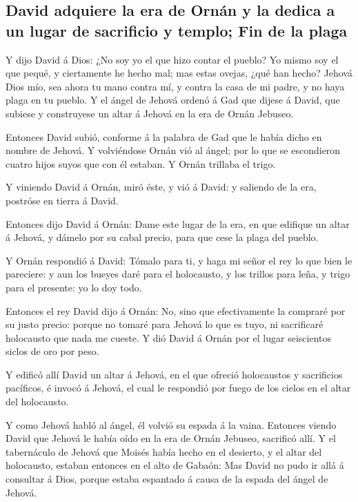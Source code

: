 \hypertarget{david-adquiere-la-era-de-ornuxe1n-y-la-dedica-a-un-lugar-de-sacrificio-y-templo-fin-de-la-plaga}{%
\subsection{David adquiere la era de Ornán y la dedica a un lugar de
sacrificio y templo; Fin de la
plaga}\label{david-adquiere-la-era-de-ornuxe1n-y-la-dedica-a-un-lugar-de-sacrificio-y-templo-fin-de-la-plaga}}

 Y dijo David á Dios: ¿No soy yo el que hizo contar el
pueblo? Yo mismo soy el que pequé, y ciertamente he hecho mal; mas estas
ovejas, ¿qué han hecho? Jehová Dios mío, sea ahora tu mano contra mí, y
contra la casa de mi padre, y no haya plaga en tu pueblo. 
Y el ángel de Jehová ordenó á Gad que dijese á David, que subiese y
construyese un altar á Jehová en la era de Ornán Jebuseo.

 Entonces David subió, conforme á la palabra de Gad que le
había dicho en nombre de Jehová.  Y volviéndose Ornán vió
al ángel; por lo que se escondieron cuatro hijos suyos que con él
estaban. Y Ornán trillaba el trigo.

 Y viniendo David á Ornán, miró éste, y vió á David: y
saliendo de la era, postróse en tierra á David.

 Entonces dijo David á Ornán: Dame este lugar de la era, en
que edifique un altar á Jehová, y dámelo por su cabal precio, para que
cese la plaga del pueblo.

 Y Ornán respondió á David: Tómalo para ti, y haga mi señor
el rey lo que bien le pareciere: y aun los bueyes daré para el
holocausto, y los trillos para leña, y trigo para el presente: yo lo doy
todo.

 Entonces el rey David dijo á Ornán: No, sino que
efectivamente la compraré por su justo precio: porque no tomaré para
Jehová lo que es tuyo, ni sacrificaré holocausto que nada me cueste.
 Y dió David á Ornán por el lugar seiscientos siclos de oro
por peso.

 Y edificó allí David un altar á Jehová, en el que ofreció
holocaustos y sacrificios pacíficos, é invocó á Jehová, el cual le
respondió por fuego de los cielos en el altar del holocausto.

 Y como Jehová habló al ángel, él volvió su espada á la
vaina.  Entonces viendo David que Jehová le había oído en
la era de Ornán Jebuseo, sacrificó allí.  Y el tabernáculo
de Jehová que Moisés había hecho en el desierto, y el altar del
holocausto, estaban entonces en el alto de Gabaón: Mas David no pudo ir
allá á consultar á Dios, porque estaba espantado á causa de la espada
del ángel de Jehová.

